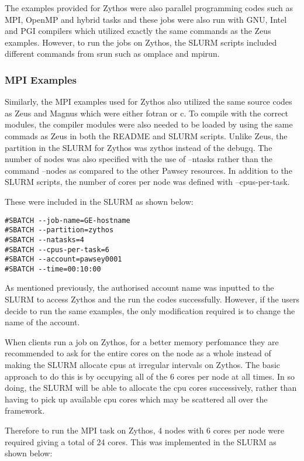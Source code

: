 \documentclass[journal]{IEEEtran}
\begin{document}
The examples provided for Zythos were also parallel programming codes such as MPI, OpenMP and hybrid tasks and these jobs were also run with GNU, Intel
and PGI compilers which utilized exactly the same commands as the Zeus examples. However, to run the jobs on Zythos, the SLURM scripts included
different commands from srun such as omplace and mpirun. 


\subsubsection{MPI Examples}

Similarly, the MPI examples used for Zythos also utilized the same source codes as Zeus and Magnus which were either fotran or c. To compile with the
correct modules, the compiler modules were also needed to be loaded by using the same commads as Zeus in both the README and SLURM scripts. Unlike Zeus, 
the partition in the SLURM for Zythos was zythos instead of the debugq. The number of nodes was also specified with the use of --ntasks rather than the 
command --nodes as compared to the other Pawsey resources. In addition to the SLURM scripts, the number of cores per node was defined with 
--cpus-per-task.    

These were included in the SLURM as shown below:

\begin{verbatim}
#SBATCH --job-name=GE-hostname
#SBATCH --partition=zythos
#SBATCH --natasks=4
#SBATCH --cpus-per-task=6
#SBATCH --account=pawsey0001
#SBATCH --time=00:10:00
\end{verbatim}

As mentioned previously, the authorised account name was inputted to the SLURM to access Zythos and the run the codes successfully. However, if the
users decide to run the same examples, the only modification required is to change the name of the account.

When clients run a job on Zythos, for a better memory perfomance they  are recommended to ask for the entire cores on the node as a whole instead of making the SLURM
allocate cpus at irregular intervals on Zythos. The basic approach to do this is by occupying all of the 6 cores per node at all times. In so doing, 
the SLURM will be able to allocate the cpu cores successively, rather than having to pick up available cpu cores which may be scattered all over the 
framework.

Therefore to run the MPI task on Zythos, 4 nodes with 6 cores per node were required giving a total of 24 cores. This was implemented in the SLURM as 
shown below:
\end{document}
